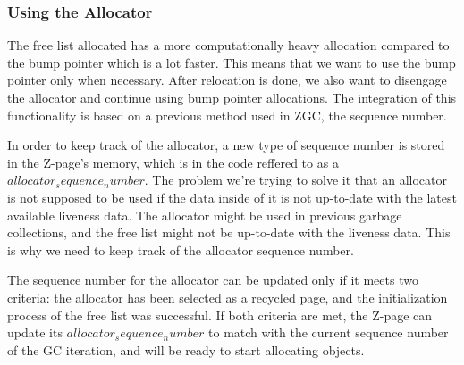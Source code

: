 \subsubsection{Using the Allocator}
The free list allocated has a more computationally heavy allocation compared to the bump pointer which is a lot faster. This means that we want to use the bump pointer only when necessary. After relocation is done, we also want to disengage the allocator and continue using bump pointer allocations. The integration of this functionality is based on a previous method used in ZGC, the sequence number.

In order to keep track of the allocator, a new type of sequence number is stored in the Z-page's memory, which is in the code reffered to as a $allocator_sequence_number$. The problem we're trying to solve it that an allocator is not supposed to be used if the data inside of it is not up-to-date with the latest available liveness data. The allocator might be used in previous garbage collections, and the free list might not be up-to-date with the liveness data. This is why we need to keep track of the allocator sequence number.

The sequence number for the allocator can be updated only if it meets two criteria: the allocator has been selected as a recycled page, and the initialization process of the free list was successful. If both criteria are met, the Z-page can update its $allocator_sequence_number$ to match with the current sequence number of the GC iteration, and will be ready to start allocating objects.
